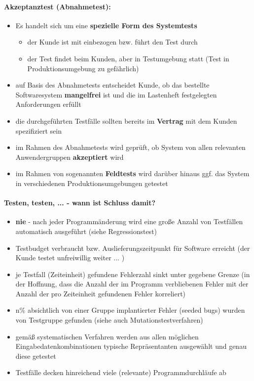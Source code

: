 \paragraph{Akzeptanztest (Abnahmetest):}
\begin{itemize}
	\item Es handelt sich um eine \textbf{spezielle Form des Systemtests}
	\begin{itemize}
		\item der Kunde ist mit einbezogen bzw. führt den Test durch
		\item der Test findet beim Kunden, aber in Testumgebung statt (Test in Produktionsumgebung zu gefährlich)
	\end{itemize}
	\item auf Basis des Abnahmetests entscheidet Kunde, ob das bestellte Softwaresystem \textbf{mangelfrei} ist und die im Lastenheft festgelegten Anforderungen erfüllt
	\item die durchgeführten Testfälle sollten bereits im \textbf{Vertrag} mit dem Kunden spezifiziert sein
	\item im Rahmen des Abnahmetests wird geprüft, ob System von allen relevanten Anwendergruppen \textbf{akzeptiert} wird
	\item im Rahmen von sogenannten \textbf{Feldtests} wird darüber hinaus ggf. das System in verschiedenen Produktionsumgebungen getestet
\end{itemize}

\paragraph{Testen, testen, ... - wann ist Schluss damit?}
\begin{itemize}
	\item \textbf{nie} - nach jeder Programmänderung wird eine große Anzahl von Testfällen automatisch ausgeführt (siehe Regressionstest)
	\item Testbudget verbraucht bzw. Auslieferungszeitpunkt für Software erreicht (der Kunde testet unfreiwillig weiter ... )
	\item je Testfall (Zeiteinheit) gefundene Fehlerzahl sinkt unter gegebene Grenze (in der Hoffnung, dass die Anzahl der im Programm verbliebenen Fehler mit der Anzahl der pro Zeiteinheit gefundenen Fehler korreliert)
	\item n\% absichtlich von einer Gruppe implantierter Fehler (seeded bugs) wurden von Testgruppe gefunden (siehe auch Mutationstestverfahren)
	\item gemäß systematischen Verfahren werden aus allen möglichen Eingabedatenkombinationen typische Repräsentanten ausgewählt und genau diese getestet
	\item Testfälle decken hinreichend viele (relevante) Programmdurchläufe ab
\end{itemize}

